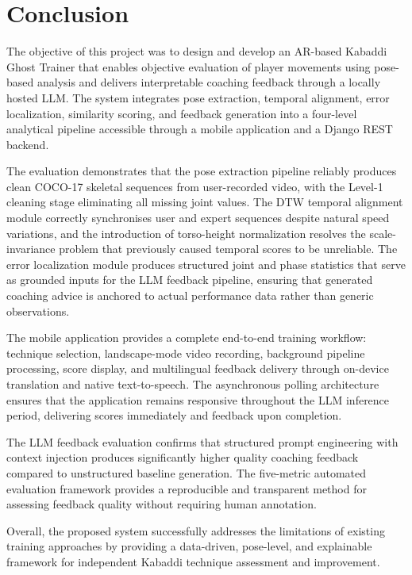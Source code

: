 \begin{sloppypar}
\section{Conclusion}

The objective of this project was to design and develop an AR-based Kabaddi Ghost Trainer that enables objective evaluation of player movements using pose-based analysis and delivers interpretable coaching feedback through a locally hosted LLM. The system integrates pose extraction, temporal alignment, error localization, similarity scoring, and feedback generation into a four-level analytical pipeline accessible through a mobile application and a Django REST backend.

The evaluation demonstrates that the pose extraction pipeline reliably produces clean COCO-17 skeletal sequences from user-recorded video, with the Level-1 cleaning stage eliminating all missing joint values. The DTW temporal alignment module correctly synchronises user and expert sequences despite natural speed variations, and the introduction of torso-height normalization resolves the scale-invariance problem that previously caused temporal scores to be unreliable. The error localization module produces structured joint and phase statistics that serve as grounded inputs for the LLM feedback pipeline, ensuring that generated coaching advice is anchored to actual performance data rather than generic observations.

The mobile application provides a complete end-to-end training workflow: technique selection, landscape-mode video recording, background pipeline processing, score display, and multilingual feedback delivery through on-device translation and native text-to-speech. The asynchronous polling architecture ensures that the application remains responsive throughout the LLM inference period, delivering scores immediately and feedback upon completion.

The LLM feedback evaluation confirms that structured prompt engineering with context injection produces significantly higher quality coaching feedback compared to unstructured baseline generation. The five-metric automated evaluation framework provides a reproducible and transparent method for assessing feedback quality without requiring human annotation.

Overall, the proposed system successfully addresses the limitations of existing training approaches by providing a data-driven, pose-level, and explainable framework for independent Kabaddi technique assessment and improvement.



\end{sloppypar}
